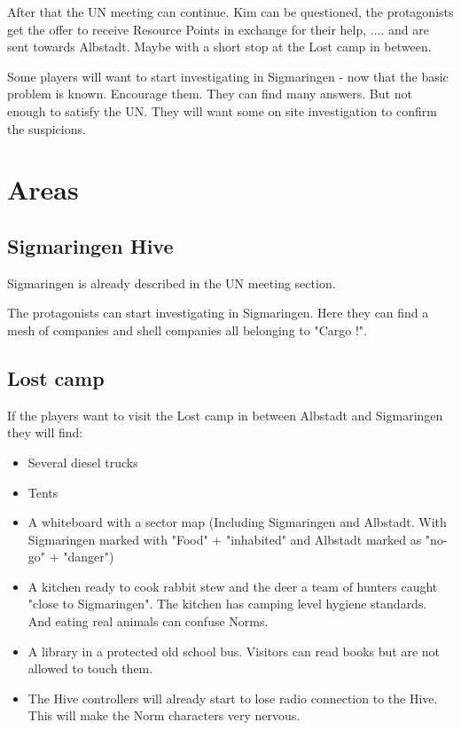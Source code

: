 After that the UN meeting can continue. Kim can be questioned, the protagonists get the offer to receive Resource Points in exchange for their help, .... and are sent towards Albstadt. Maybe with a short stop at the Lost camp in between.

Some players will want to start investigating in Sigmaringen - now that the basic problem is known. Encourage them. They can find many answers. But not enough to satisfy the UN. They will want some on site investigation to confirm the suspicions.

\section{Areas}

\subsection{Sigmaringen Hive}

Sigmaringen is already described in the UN meeting section.

The protagonists can start investigating in Sigmaringen. Here they can find a mesh of companies and shell companies all belonging to "Cargo !".

\subsection{Lost camp}

If the players want to visit the Lost camp in between Albstadt and Sigmaringen they will find:

\begin{itemize}
    \item Several diesel trucks
    \item Tents
    \item A whiteboard with a sector map (Including Sigmaringen and Albstadt. With Sigmaringen marked with "Food" + "inhabited" and Albstadt marked as "no-go" + "danger")
    \item A kitchen ready to cook rabbit stew and the deer a team of hunters caught "close to Sigmaringen". The kitchen has camping level hygiene standards. And eating real animals can confuse Norms.
    \item A library in a protected old school bus. Visitors can read books but are not allowed to touch them.
    \item The Hive controllers will already start to lose radio connection to the Hive. This will make the Norm characters very nervous.
\end{itemize}

